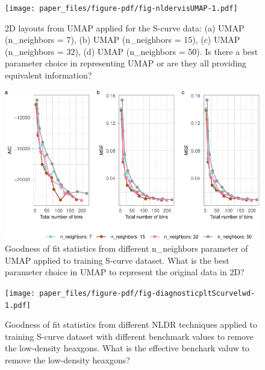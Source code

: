 \documentclass[
  12pt]{article}
\begin{document}
\begin{figure}

{\centering \texttt{[image: paper\_files/figure-pdf/fig-nldervisUMAP-1.pdf]}

}

\caption{\label{fig-nldervisUMAP}2D layouts from UMAP applied for the
S-curve data: (a) UMAP (n\_neighbors = 7), (b) UMAP (n\_neighbors = 15),
(c) UMAP (n\_neighbors = 32), (d) UMAP (n\_neighbors = 50). Is there a
best parameter choice in representing UMAP or are they all providing
equivalent information?}

\end{figure}

\begin{figure}

{\centering \includegraphics[width=1\textwidth,height=\textheight]{paper_files/figure-pdf/fig-diagnosticpltDiffParam-1.pdf}

}

\caption{\label{fig-diagnosticpltDiffParam}Goodness of fit statistics
from different n\_neighbors parameter of UMAP applied to training
S-curve dataset. What is the best parameter choice in UMAP to represent
the original data in 2D?}

\end{figure}

\begin{figure}

{\centering \texttt{[image: paper\_files/figure-pdf/fig-diagnosticpltScurvelwd-1.pdf]}

}

\caption{\label{fig-diagnosticpltScurvelwd}Goodness of fit statistics
from different NLDR techniques applied to training S-curve dataset with
different benchmark values to remove the low-density heaxgons. What is
the effective benchark valuw to remove the low-density heaxgons?}

\end{figure}
\end{document}
